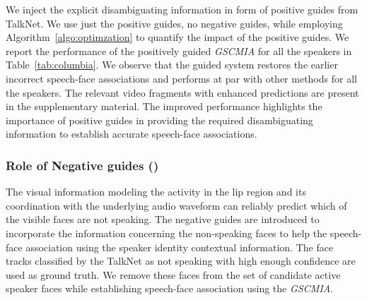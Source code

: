 We inject the explicit disambiguating information in form of positive guides from TalkNet. We use just the positive guides, no negative guides, while employing Algorithm~\ref{algo:optimzation} to quantify the impact of the positive guides. We report the performance of the positively guided \emph{GSCMIA} for all the speakers in Table~\ref{tab:columbia}. We observe that the guided system restores the earlier incorrect speech-face associations and performs at par with other methods for all the speakers. The relevant video fragments with enhanced predictions are present in the supplementary material. The improved performance highlights the importance of positive guides in providing the required disambiguating information to establish accurate speech-face associations. 

\subsubsection{Role of Negative guides ()}
The visual information modeling the activity in the lip region and its coordination with the underlying audio waveform can reliably predict which of the visible faces are not speaking. The negative guides are introduced to incorporate the information concerning the non-speaking faces to help the speech-face association using the speaker identity contextual information. The face tracks classified by the TalkNet as not speaking with high enough confidence are used as ground truth. We remove these faces from the set of candidate active speaker faces while establishing speech-face association using the \emph{GSCMIA}.

